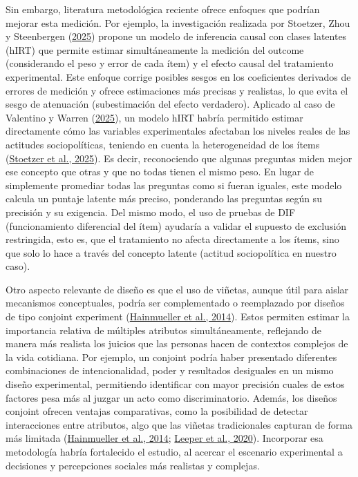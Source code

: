 \documentclass[
  13pt,
  a4paper,
]{article}
\begin{document}
Sin embargo, literatura metodológica reciente ofrece enfoques que podrían mejorar esta medición. Por ejemplo, la investigación realizada por Stoetzer, Zhou y Steenbergen (\protect\hyperlink{ref-stoetzer_causal_2025}{2025}) propone un modelo de inferencia causal con clases latentes (hIRT) que permite estimar simultáneamente la medición del outcome (considerando el peso y error de cada ítem) y el efecto causal del tratamiento experimental. Este enfoque corrige posibles sesgos en los coeficientes derivados de errores de medición y ofrece estimaciones más precisas y realistas, lo que evita el sesgo de atenuación (subestimación del efecto verdadero). Aplicado al caso de Valentino y Warren (\protect\hyperlink{ref-valentino_cultural_2025}{2025}), un modelo hIRT habría permitido estimar directamente cómo las variables experimentales afectaban los niveles reales de las actitudes sociopolíticas, teniendo en cuenta la heterogeneidad de los ítems (\protect\hyperlink{ref-stoetzer_causal_2025}{Stoetzer et al., 2025}). Es decir, reconociendo que algunas preguntas miden mejor ese concepto que otras y que no todas tienen el mismo peso. En lugar de simplemente promediar todas las preguntas como si fueran iguales, este modelo calcula un puntaje latente más preciso, ponderando las preguntas según su precisión y su exigencia. Del mismo modo, el uso de pruebas de DIF (funcionamiento diferencial del ítem) ayudaría a validar el supuesto de exclusión restringida, esto es, que el tratamiento no afecta directamente a los ítems, sino que solo lo hace a través del concepto latente (actitud sociopolítica en nuestro caso).

Otro aspecto relevante de diseño es que el uso de viñetas, aunque útil para aislar mecanismos conceptuales, podría ser complementado o reemplazado por diseños de tipo conjoint experiment (\protect\hyperlink{ref-hainmueller_causal_2014}{Hainmueller et al., 2014}). Estos permiten estimar la importancia relativa de múltiples atributos simultáneamente, reflejando de manera más realista los juicios que las personas hacen de contextos complejos de la vida cotidiana. Por ejemplo, un conjoint podría haber presentado diferentes combinaciones de intencionalidad, poder y resultados desiguales en un mismo diseño experimental, permitiendo identificar con mayor precisión cuales de estos factores pesa más al juzgar un acto como discriminatorio. Además, los diseños conjoint ofrecen ventajas comparativas, como la posibilidad de detectar interacciones entre atributos, algo que las viñetas tradicionales capturan de forma más limitada (\protect\hyperlink{ref-hainmueller_causal_2014}{Hainmueller et al., 2014}; \protect\hyperlink{ref-leeper_measuring_2020}{Leeper et al., 2020}). Incorporar esa metodología habría fortalecido el estudio, al acercar el escenario experimental a decisiones y percepciones sociales más realistas y complejas.
\end{document}
